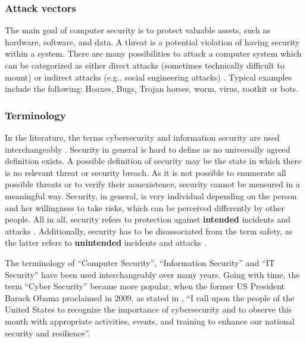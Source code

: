 \subsubsection{Attack vectors}
The main goal of computer security is to protect valuable assets, such as hardware, software, and data. A threat is a potential violation of having security within a system. There are many possibilities to attack a computer system which can be categorized as either direct attacks (sometimes technically difficult to mount) or indirect attacks (e.g., social engineering attacks) \cite{Bishop2003}. Typical examples include the following: Hoaxes, Bugs, Trojan horses,  worm, virus, rootkit or bots.

\subsubsection{Terminology}
In the literature, the terms cybersecurity and information security are used interchangeably \cite{VonSolms2013}. Security in general is hard to define as no universally agreed definition exists. A possible definition of security may be the state in which there is no relevant threat or security breach. As it is not possible to enumerate all possible threats or to verify their nonexistence, security cannot be measured in a meaningful way. Security, in general, is very individual depending on the person and her willingness to take risks, which can be perceived differently by other people. All in all, security refers to protection against \textbf{intended} incidents and attacks \cite{Bishop2004, Pfleeger2014}. Additionally, security has to be disassociated from the term safety, as the latter refers to \textbf{unintended} incidents and attacks \cite{Bishop2004}.

The terminology of ``Computer Security'', ``Information Security'' and ``IT Security'' have been used interchangeably over many years. Going with time, the term ``Cyber Security'' became more popular, when the former US President Barack Obama proclaimed in 2009, as stated in \cite{TheWhiteHouse2009}, ``I call upon the people of the United States to recognize the importance of cybersecurity and to observe this month with appropriate activities, events, and training to enhance our national security and resilience''.









